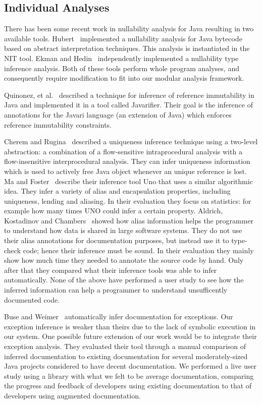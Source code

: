 \subsection{Individual Analyses}

There has been some recent work in nullability analysis for Java
resulting in two available tools.  Hubert~\cite{NIT} implemented a nullability
analysis for Java bytecode based on abstract interpretation techniques.  This
analysis is instantiated in the {\sc NIT} tool.  Ekman and
Hedin~\cite{NonNullTypeInference} independently implemented a nullability type
inference analysis.  Both of these tools perform whole program analyses, and
consequently require modification to fit into our modular analysis framework.

Quinonez, et al.~\cite{Javarifier} described a technique for inference of
reference immutability in Java and implemented it in a tool called {\sc
  Javarifier}. Their goal is the inference of annotations for the {\sc Javari}
language (an extension of Java) which enforces reference immutability
constraints. %

Cherem and Rugina~\cite{UniquenessInference} described a uniqueness inference
technique using a two-level abstraction: a combination of a flow-sensitive
intraprocedural analysis with a flow-insensitive interprocedural analysis. 
They can infer uniqueness information which is used to actively free Java
object whenever an unique reference is lost.  Ma and
Foster~\cite{Uno} describe their inference tool Uno that uses a similar
algorithmic idea. They infer a variety of alias and encapsulation
properties, including uniqueness, lending and aliasing. In their evaluation
they focus on statistics: for example how many times UNO could infer a certain property.
Aldrich, Kostadinov and Chambers~\cite{AliasJava} showed how alias information helps the
programmer to understand how data is shared in large software systems. 
They do not use their alias annotations for documentation purposes, but instead use
it to type-check code; hence their inference must be sound. In their evaluation
they mainly show how much time they needed to annotate the source code by hand. Only
after that they compared what their inference tools was able to infer automatically.
None of the above have performed a user study to see how the inferred information
can help a programmer to understand unsufficently documented code.

Buse and Weimer~\cite{autodoc} automatically infer documentation for
exceptions.  Our exception inference is weaker than theirs due to the lack of
symbolic execution in our system.  One
possible future extension of our work would be to integrate their exception
analysis.  They evaluated their tool through a manual comparison of inferred documentation to
existing documentation for several moderately-sized Java projects considered to
have decent documentation.  We performed a live user study using a library with what
we felt to be average documentation, comparing the progress and feedback of
developers using existing documentation to that of developers using augmented
documentation.
